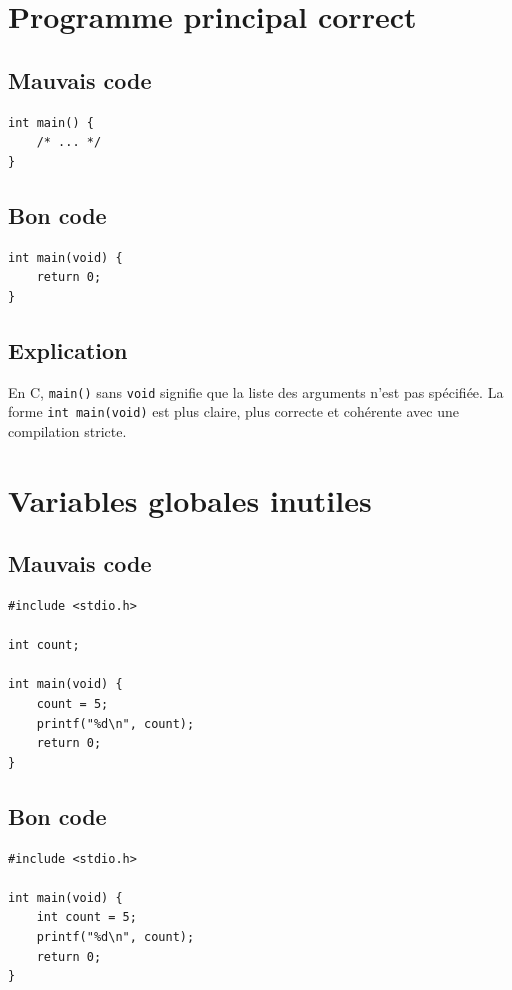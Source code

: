 \documentclass[a4paper,11pt]{report}
\begin{document}
\chapter{Programme principal correct}

\section{Mauvais code}
\begin{lstlisting}
int main() {
    /* ... */
}
\end{lstlisting}

\section{Bon code}
\begin{lstlisting}
int main(void) {
    return 0;
}
\end{lstlisting}

\section{Explication}
En C, \texttt{main()} sans \texttt{void} signifie que la liste des arguments n'est pas spécifiée.
La forme \texttt{int main(void)} est plus claire, plus correcte et cohérente avec une compilation stricte.

\chapter{Variables globales inutiles}

\section{Mauvais code}
\begin{lstlisting}
#include <stdio.h>

int count;

int main(void) {
    count = 5;
    printf("%d\n", count);
    return 0;
}
\end{lstlisting}

\section{Bon code}
\begin{lstlisting}
#include <stdio.h>

int main(void) {
    int count = 5;
    printf("%d\n", count);
    return 0;
}
\end{lstlisting}
\end{document}

